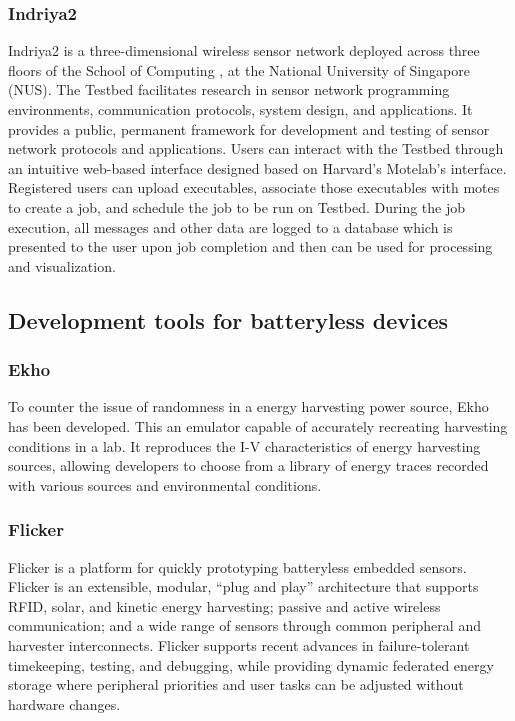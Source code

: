 \documentclass[]{article}
\begin{document}
\subsubsection{Indriya2}

Indriya2 \cite{indriya2} is a three-dimensional wireless sensor network deployed across three floors of the School of Computing , at the National University of Singapore (NUS). The Testbed facilitates research in sensor network programming environments, communication protocols, system design, and applications. It provides a public, permanent framework for development and testing of sensor network protocols and applications. Users can interact with the Testbed through an intuitive web-based interface designed based on Harvard's Motelab's interface. Registered users can upload executables, associate those executables with motes to create a job, and schedule the job to be run on Testbed. During the job execution, all messages and other data are logged to a database which is presented to the user upon job completion and then can be used for processing and visualization. 

\subsection{Development tools for batteryless devices}

\subsubsection{Ekho}

To counter the issue of randomness in a energy harvesting power source, Ekho \cite{ekho} has been developed. This an emulator capable of accurately recreating harvesting conditions in a lab. It reproduces the I-V characteristics of energy harvesting sources, allowing developers to choose from a library of energy traces recorded with various sources and environmental conditions.

\subsubsection{Flicker}
Flicker \cite{flicker} is a platform for quickly prototyping batteryless embedded sensors. Flicker is an extensible, modular, “plug and play” architecture that supports RFID, solar, and kinetic energy harvesting; passive and active wireless communication; and a wide range of sensors through common peripheral and harvester interconnects. Flicker supports recent advances in failure-tolerant timekeeping, testing, and debugging, while providing dynamic federated energy storage where peripheral priorities and user tasks can be adjusted without hardware changes.
\end{document}

